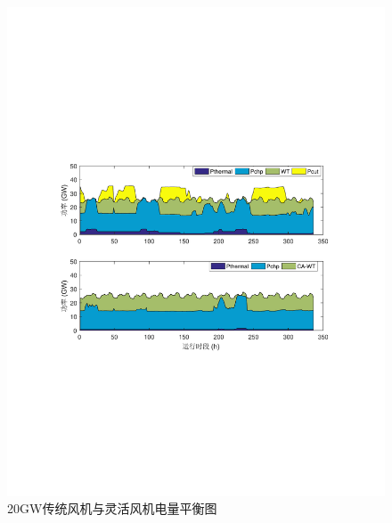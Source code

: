 \begin{figure}[H] %
  \centering
  \includegraphics[scale=0.85]{figures/Chap5-Power-Balance-20G-WT.pdf}
  \caption{20GW传统风机与灵活风机电量平衡图}
  \label{fig:Power-Balance-20G-WT}
\end{figure}

